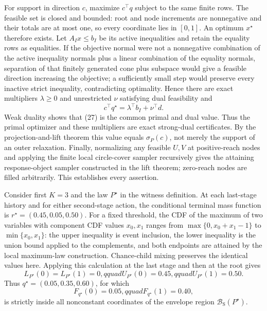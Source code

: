 For support in direction \(c\), maximize \(c^\top q\) subject to the same finite rows.  The feasible set is closed and bounded: root and node increments are nonnegative and their totals are at most one, so every coordinate lies in \([0,1]\).  An optimum \(x^\star\) therefore exists.  Let \(A_Ix\leq b_I\) be its active inequalities and retain the equality rows as equalities.  If the objective normal were not a nonnegative combination of the active inequality normals plus a linear combination of the equality normals, separation of that finitely generated cone plus subspace would give a feasible direction increasing the objective; a sufficiently small step would preserve every inactive strict inequality, contradicting optimality.  Hence there are exact multipliers \(\lambda\geq0\) and unrestricted \(\nu\) satisfying dual feasibility and
\[
 c^\top q^\star=\lambda^\top b_I+\nu^\top d.             \tag{27}
\]
Weak duality shows that (27) is the common primal and dual value.  Thus the primal optimizer and these multipliers are exact strong-dual certificates.  By the projection-and-lift theorem this value equals \(\sigma_P(c)\), not merely the support of an outer relaxation.  Finally, normalizing any feasible \(U,V\) at positive-reach nodes and applying the finite local circle-cover sampler recursively gives the attaining response-object sampler constructed in the lift theorem; zero-reach nodes are filled arbitrarily.  This establishes every assertion.

Consider first \(K=3\) and the law \(P^\star\) in the witness definition.  At each last-stage history and for either second-stage action, the conditional terminal mass function is \(r^\star=(0.45,0.05,0.50)\).  For a fixed threshold, the CDF of the maximum of two variables with component CDF values \(x_0,x_1\) ranges from \(\max\{0,x_0+x_1-1\}\) to \(\min\{x_0,x_1\}\): the upper inequality is event inclusion, the lower inequality is the union bound applied to the complements, and both endpoints are attained by the local maximum-law construction.  Chance-child mixing preserves the identical values here.  Applying this calculation at the last stage and then at the root gives
\[
 L_{P^\star}(0)=L_{P^\star}(1)=0,qquad
 U_{P^\star}(0)=0.45,qquad U_{P^\star}(1)=0.50.          \tag{28}
\]
Thus \(q^\star=(0.05,0.35,0.60)\), for which
\[
 F_{q^\star}(0)=0.05,qquad F_{q^\star}(1)=0.40,          \tag{29}
\]
is strictly inside all nonconstant coordinates of the envelope region \(\mathcal B_{\mathrm S}(P^\star)\).

